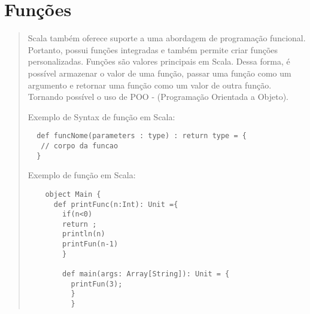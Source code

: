 \section{Fun\c{c}\~{o}es}
\begin{quote}
  Scala também oferece suporte a uma abordagem de programação funcional. Portanto, possui funções integradas e também permite criar funções personalizadas.
  Funções são valores principais em Scala. Dessa forma, é possível armazenar o valor de uma função, passar uma função como um argumento e retornar uma função como um valor de outra função. Tornando possível o uso de POO - (Programação Orientada a Objeto).
  \cite{Wampler2021}

  \begin{itemize}
    \hspace{2.5mm} Exemplo de Syntax de função em Scala:

    \begin{lstlisting}
  def funcNome(parameters : type) : return type = {
   // corpo da funcao
  }
  \end{lstlisting}


  \hspace{2.5mm} Exemplo de função em Scala:

  \begin{lstlisting}
    object Main {
      def printFunc(n:Int): Unit ={
        if(n<0)
        return ;
        println(n)
        printFun(n-1)
        }

        def main(args: Array[String]): Unit = {
          printFun(3);
          }
          }
  \end{lstlisting}

\end{itemize}
\end{quote}



